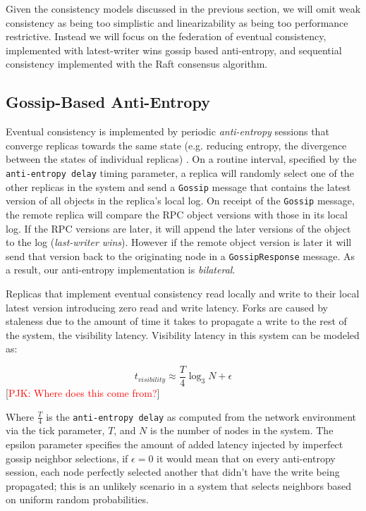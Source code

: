 \documentclass[10pt,conference,compsocconf,letterpaper]{IEEEtran}
\newcommand{\todo}[1]{{\textcolor{red}{#1}}}
\newcommand{\pjk}[1]{[\todo{PJK: #1}]}
\begin{document}
Given the consistency models discussed in the previous section, we will omit weak consistency as being too simplistic and linearizability as being too performance restrictive. Instead we will focus on the federation of eventual consistency, implemented with latest-writer wins gossip based anti-entropy, and sequential consistency implemented with the Raft consensus algorithm.

\subsection{Gossip-Based Anti-Entropy}

Eventual consistency is implemented by periodic \textit{anti-entropy} sessions that converge replicas towards the same state (e.g. reducing entropy, the divergence between the states of individual replicas) \cite{kempe_gossip-based_2003}. On a routine interval, specified by the \texttt{anti-entropy delay} timing parameter, a replica will randomly select one of the other replicas in the system and send a \texttt{Gossip} message that contains the latest version of all objects in the replica's local log. On receipt of the \texttt{Gossip} message, the remote replica will compare the RPC object versions with those in its local log. If the RPC versions are later, it will append the later versions of the object to the log (\textit{last-writer wins}). However if the remote object version is later it will send that version back to the originating node in a \texttt{GossipResponse} message. As a result, our anti-entropy implementation is \textit{bilateral}.

Replicas that implement eventual consistency read locally and write to their local latest version introducing zero read and write latency. Forks are caused by staleness due to the amount of time it takes to propagate a write to the rest of the system, the visibility latency. Visibility latency in this system can be modeled as:

\begin{equation}
t_{visibility} \approx \frac{T}{4} \log_3N + \epsilon
\end{equation}
\pjk{Where does this come from?}

Where $\frac{T}{4}$ is the \texttt{anti-entropy delay} as computed from the network environment via the tick parameter, $T$, and $N$ is the number of nodes in the system. The epsilon parameter specifies the amount of added latency injected by imperfect gossip neighbor selections, if $\epsilon = 0$ it would mean that on every anti-entropy session, each node perfectly selected another that didn't have the write being propagated; this is an unlikely scenario in a system that selects neighbors based on uniform random probabilities.
\end{document}

